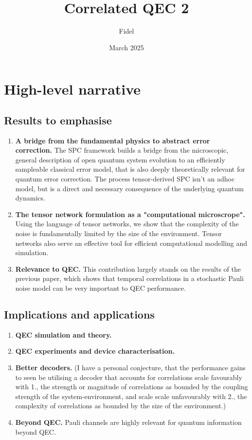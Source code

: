 \documentclass{article}
\title{Correlated QEC 2}
\author{Fidel}
\date{March 2025}
\begin{document}
\maketitle

\section{High-level narrative}
\subsection{Results to emphasise}
\begin{enumerate}
    \item \textbf{A bridge from the fundamental physics to abstract error correction.} The SPC framework builds a bridge from the microscopic, general description of open quantum system evolution to an efficiently sampleable classical error model, that is also deeply theoretically relevant for quantum error correction. The process tensor-derived SPC isn't an adhoc model, but is a direct and necessary consequence of the underlying quantum dynamics.
    \item \textbf{The tensor network formulation as a "computational microscrope".} Using the language of tensor networks, we show that the complexity of the noise is fundamentally limited by the size of the environment. Tensor networks also serve an effective tool for efficient computational modelling and simulation.
    \item \textbf{Relevance to QEC.} This contribution largely stands on the results of the previous paper, which shows that temporal correlations in a stochastic Pauli noise model can be very important to QEC performance.
    
\end{enumerate}

\subsection{Implications and applications}
\begin{enumerate}
    \item \textbf{QEC simulation and theory.}
    \item \textbf{QEC experiments and device characterisation.}
    \item \textbf{Better decoders.} (I have a personal conjecture, that the performance gains to seen be utilising a decoder that accounts for correlations scale favourably with 1., the strength or magnitude of correlations as bounded by the coupling strength of the system-environment, and scale scale unfavourably with 2., the complexity of correlations as bounded by the size of the environment.)
    \item \textbf{Beyond QEC.} Pauli channels are highly relevant for quantum information beyond QEC.
\end{enumerate}
\end{document}
